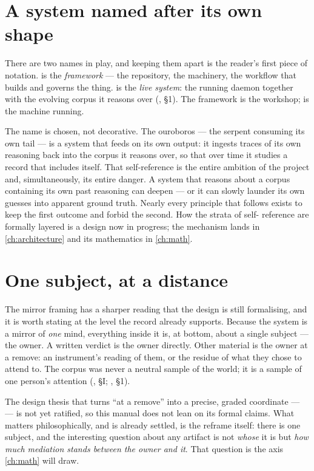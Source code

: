 \section{A system named after its own shape}
\label{sec:ouroboros}

There are two names in play, and keeping them apart is the reader's first piece of
notation. \mindpalace{} is the \emph{framework} --- the repository, the machinery,
the workflow that builds and governs the thing. \Ouroboros{} is the \emph{live
system}: the running daemon together with the evolving corpus it reasons over
(, \S 1). The framework is the workshop;
\Ouroboros{} is the machine running.

The name is chosen, not decorative. The ouroboros --- the serpent consuming its
own tail --- is a system that feeds on its own output: it ingests traces of its own
reasoning back into the corpus it reasons over, so that over time it studies a
record that includes itself. That self-reference is the entire ambition of the
project and, simultaneously, its entire danger. A system that reasons about a
corpus containing its own past reasoning can deepen --- or it can slowly launder
its own guesses into apparent ground truth. Nearly every principle that follows
exists to keep the first outcome and forbid the second. How the strata of self-
reference are formally layered is a design now in progress; the mechanism lands in
\autoref{ch:architecture} and its mathematics in \autoref{ch:math}.

\section{One subject, at a distance}
\label{sec:one-subject}

The mirror framing has a sharper reading that the design is still formalising, and
it is worth stating at the level the record already supports. Because the system is
a mirror of \emph{one} mind, everything inside it is, at bottom, about a single
subject --- the owner. A written verdict is the owner directly. Other material is
the owner at a remove: an instrument's reading of them, or the residue of what they
chose to attend to. The corpus was never a neutral sample of the world; it is a
sample of one person's attention (, \S I;
, \S 1).

The design thesis that turns ``at a remove'' into a precise, graded coordinate ---
 --- is not yet ratified, so this manual
does not lean on its formal claims. What matters philosophically, and is already
settled, is the reframe itself: there is one subject, and the interesting question
about any artifact is not \emph{whose} it is but \emph{how much mediation stands
between the owner and it}. That question is the axis \autoref{ch:math} will draw.

